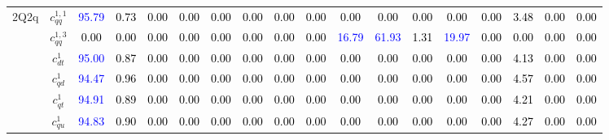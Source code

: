 \documentclass{article}
\begin{document}
\begin{landscape}
\begin{table}[H]
\begin{tabular}{|c|c|c|c|c|c|c|c|c|c|c|c|c|c|c|c|c|c|}
\multirow{14}{*}{2Q2q}
 & $c_{qq}^{1,1}$ & \textcolor{blue}{95.79} & \textcolor{black}{0.73} & \textcolor{black}{0.00} & \textcolor{black}{0.00} & \textcolor{black}{0.00} & \textcolor{black}{0.00} & \textcolor{black}{0.00} & \textcolor{black}{0.00} & \textcolor{black}{0.00} & \textcolor{black}{0.00} & \textcolor{black}{0.00} & \textcolor{black}{0.00} & \textcolor{black}{0.00} & \textcolor{black}{3.48} & \textcolor{black}{0.00} & \textcolor{black}{0.00}\\ \cline{2-18}
 & $c_{qq}^{1,3}$ & \textcolor{black}{0.00} & \textcolor{black}{0.00} & \textcolor{black}{0.00} & \textcolor{black}{0.00} & \textcolor{black}{0.00} & \textcolor{black}{0.00} & \textcolor{black}{0.00} & \textcolor{black}{0.00} & \textcolor{blue}{16.79} & \textcolor{blue}{61.93} & \textcolor{black}{1.31} & \textcolor{blue}{19.97} & \textcolor{black}{0.00} & \textcolor{black}{0.00} & \textcolor{black}{0.00} & \textcolor{black}{0.00}\\ \cline{2-18}
 & $c_{dt}^{1}$ & \textcolor{blue}{95.00} & \textcolor{black}{0.87} & \textcolor{black}{0.00} & \textcolor{black}{0.00} & \textcolor{black}{0.00} & \textcolor{black}{0.00} & \textcolor{black}{0.00} & \textcolor{black}{0.00} & \textcolor{black}{0.00} & \textcolor{black}{0.00} & \textcolor{black}{0.00} & \textcolor{black}{0.00} & \textcolor{black}{0.00} & \textcolor{black}{4.13} & \textcolor{black}{0.00} & \textcolor{black}{0.00}\\ \cline{2-18}
 & $c_{qd}^{1}$ & \textcolor{blue}{94.47} & \textcolor{black}{0.96} & \textcolor{black}{0.00} & \textcolor{black}{0.00} & \textcolor{black}{0.00} & \textcolor{black}{0.00} & \textcolor{black}{0.00} & \textcolor{black}{0.00} & \textcolor{black}{0.00} & \textcolor{black}{0.00} & \textcolor{black}{0.00} & \textcolor{black}{0.00} & \textcolor{black}{0.00} & \textcolor{black}{4.57} & \textcolor{black}{0.00} & \textcolor{black}{0.00}\\ \cline{2-18}
 & $c_{qt}^{1}$ & \textcolor{blue}{94.91} & \textcolor{black}{0.89} & \textcolor{black}{0.00} & \textcolor{black}{0.00} & \textcolor{black}{0.00} & \textcolor{black}{0.00} & \textcolor{black}{0.00} & \textcolor{black}{0.00} & \textcolor{black}{0.00} & \textcolor{black}{0.00} & \textcolor{black}{0.00} & \textcolor{black}{0.00} & \textcolor{black}{0.00} & \textcolor{black}{4.21} & \textcolor{black}{0.00} & \textcolor{black}{0.00}\\ \cline{2-18}
 & $c_{qu}^{1}$ & \textcolor{blue}{94.83} & \textcolor{black}{0.90} & \textcolor{black}{0.00} & \textcolor{black}{0.00} & \textcolor{black}{0.00} & \textcolor{black}{0.00} & \textcolor{black}{0.00} & \textcolor{black}{0.00} & \textcolor{black}{0.00} & \textcolor{black}{0.00} & \textcolor{black}{0.00} & \textcolor{black}{0.00} & \textcolor{black}{0.00} & \textcolor{black}{4.27} & \textcolor{black}{0.00} & \textcolor{black}{0.00}\\ \cline{2-18}

\end{tabular}
\end{table}
\end{landscape}
\end{document}
